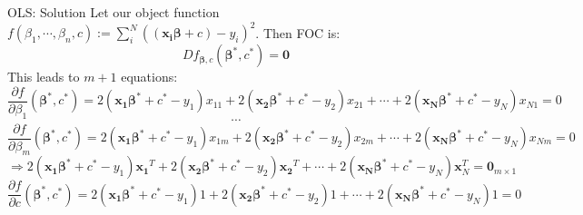 \documentclass[a4paper,11pt]{article}
\newcommand{\bd}{\mathbf}
\newcommand{\p}{\partial}
\begin{document}
\begin{frame}[t]{OLS: Solution}
	Let our object function $f(\beta_1,\cdots,\beta_n,c):=\sum_i^N ( (\bd{x_i}\bd{\beta}+{c})-y_i)^2$. Then FOC is:
	\[
		Df_{\bd{\beta},c}(\bd{\beta}^\ast,c^\ast)=\bd{0} \tag{FOC}
	\]
	This leads to $m+1$ equations:\[
		\frac{\p f}{\p \beta_1}(\bd{\beta^\ast},c^\ast) = 2(\bd{x_1}\bd{\beta^\ast}+c^\ast-y_1)x_{11}+2(\bd{x_2}\bd{\beta^\ast}+c^\ast-y_2)x_{21}+\cdots+2(\bd{x_N}\bd{\beta^\ast}+c^\ast-y_N)x_{N1} = 0
	\]\[
		\cdots
	\]\[
		\frac{\p f}{\p \beta_m}(\bd{\beta^\ast},c^\ast) = 2(\bd{x_1}\bd{\beta^\ast}+c^\ast-y_1)x_{1m}+2(\bd{x_2}\bd{\beta^\ast}+c^\ast-y_2)x_{2m}+\cdots+2(\bd{x_N}\bd{\beta^\ast}+c^\ast-y_N)x_{Nm} = 0
	\]
	\[
			\Rightarrow 2(\bd{x_1}\bd{\beta^\ast}+c^\ast-y_1)\bd{x_1}^T+2(\bd{x_2}\bd{\beta^\ast}+c^\ast-y_2)\bd{x_2}^T+\cdots+2(\bd{x_N}\bd{\beta^\ast}+c^\ast-y_N)\bd{x}_{N}^T = \bd{0}_{m\times 1}
		\tag{B}\]
	\[
		\frac{\p f}{\p c}(\bd{\beta^\ast},c^\ast) = 2(\bd{x_1}\bd{\beta^\ast}+c^\ast-y_1)1+2(\bd{x_2}\bd{\beta^\ast}+c^\ast-y_2)1+\cdots+2(\bd{x_N}\bd{\beta^\ast}+c^\ast-y_N)1 = 0 \tag{C}
	\]
\end{frame}
\end{document}
